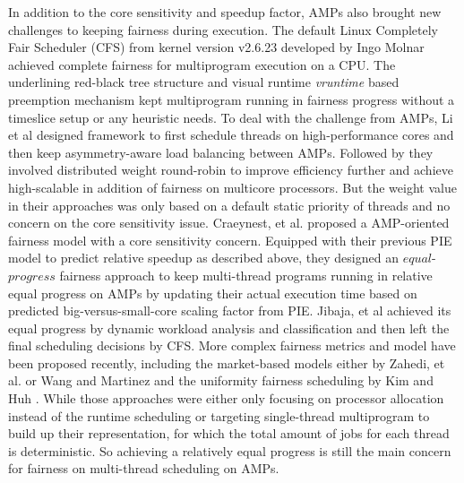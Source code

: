 \documentclass[sigplan,review,anonymous]{acmart}\settopmatter{printfolios=true,printccs=false,printacmref=false}
\begin{document}
In addition to the core sensitivity and speedup factor, AMPs also brought new challenges to keeping fairness during execution. The default Linux Completely Fair Scheduler (CFS) from kernel version v2.6.23 developed by Ingo Molnar \cite{molnar2007cfs} achieved complete fairness for multiprogram execution on a CPU. The underlining red-black tree structure and visual runtime {\it vruntime} based preemption mechanism kept multiprogram running in fairness progress without a timeslice setup or any heuristic needs. To deal with the challenge from AMPs, Li et al \cite{li2007efficient} designed framework to first schedule threads on high-performance cores and then keep  asymmetry-aware load balancing between AMPs. Followed by they involved distributed weight round-robin \cite{li2009efficient} to improve efficiency further and achieve high-scalable in addition of fairness on multicore processors. But the weight value in their approaches was only based on a default static priority of threads and no concern on the core sensitivity issue. Craeynest, et al. \cite{van2013fairness} proposed a AMP-oriented fairness model with a core sensitivity concern. Equipped with their previous PIE model to predict relative speedup as described above, they designed an $equal$-$progress$ fairness approach to keep multi-thread programs running in relative equal progress on AMPs by updating their actual execution time based on predicted big-versus-small-core scaling factor from PIE. Jibaja, et al \cite{jibaja2016portable} achieved its equal progress by dynamic workload analysis and classification and then left the final scheduling decisions by CFS.
More complex fairness metrics and model have been proposed recently, including the market-based models either by Zahedi, et al. \cite{zahedi2018amdahl} or Wang and Martinez \cite{wang2016rebudget} and the uniformity fairness scheduling by Kim and Huh \cite{kim2018exploring}. While those approaches were either only focusing on processor allocation instead of the runtime scheduling or targeting single-thread multiprogram  to build up their representation, for which the total amount of jobs for each thread is deterministic. So achieving a relatively equal progress is still the main concern for fairness on multi-thread scheduling on AMPs. 
\end{document}
